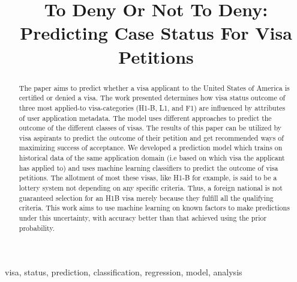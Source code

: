 \documentclass[conference]{IEEEtran}
\begin{document}
\title{To Deny Or Not To Deny: Predicting Case Status For Visa Petitions\\}
\author{
\and
{}
\and
{}
}

\maketitle
\begin{abstract}
The paper aims to predict whether a visa applicant to the United States of America is certified or denied a visa. The work presented 
determines  how  visa  status  outcome  of  three  most  applied-to visa-categories (H1-B, L1, and F1) are influenced by attributes of
user application metadata. The model uses different approaches to  predict  the  outcome  of  the  different  classes  of  visas.  The
results of this paper can be utilized by visa aspirants to predict the  outcome  of  their  petition  and  get  recommended  ways  of
maximizing  success  of  acceptance. We developed a prediction model which trains on historical data of the same application domain (i.e based on which visa the applicant has applied to) and uses machine learning classifiers  to  predict  the  outcome  of  visa  petitions. The  allotment  of  most these  visas, like H1-B for example,  is  said  to  be  a  lottery  system not  depending  on  any  specific  criteria.  Thus,  a  foreign  national is  not  guaranteed  selection  for  an  H1B  visa  merely  because  they  fulfill  all  the  qualifying  criteria.  This  work  aims  to  use machine  learning  on  known  factors  to  make  predictions  under this  uncertainty,  with  accuracy  better  than  that  achieved  using the  prior  probability.
\end{abstract}

\begin{IEEEkeywords}
visa, status, prediction, classification,
regression, model, analysis
\end{IEEEkeywords}
\end{document}
